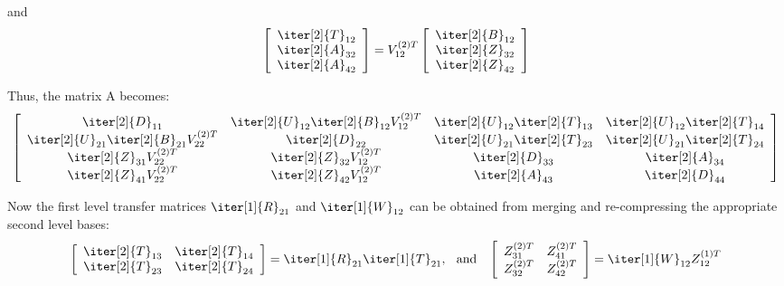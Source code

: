 \noindent and
\begin{equation}
  \left[
    \begin{array}{c}
      \iter[2]{T}_{12} \\
      \iter[2]{A}_{32} \\
      \iter[2]{A}_{42} \\
    \end{array}
  \right]
  = V_{12}^{(2)T}
  \left[
    \begin{array}{ccc}
      \iter[2]{B}_{12} \\
      \iter[2]{Z}_{32} \\
      \iter[2]{Z}_{42} \\
    \end{array}
  \right]
\end{equation}

\noindent Thus, the matrix A becomes:
\begin{equation}
  \left[
    \begin{array}{cccc}
      \iter[2]{D}_{11}& \iter[2]{U}_{12}\iter[2]{B}_{12}V_{12}^{(2)T} & \iter[2]{U}_{12}\iter[2]{T}_{13}& \iter[2]{U}_{12}\iter[2]{T}_{14} \\
      \iter[2]{U}_{21}\iter[2]{B}_{21} V_{22}^{(2)T}& \iter[2]{D}_{22} & \iter[2]{U}_{21}\iter[2]{T}_{23}& \iter[2]{U}_{21}\iter[2]{T}_{24} \\
      \iter[2]{Z}_{31}V_{22}^{(2)T} & \iter[2]{Z}_{32}V_{12}^{(2)T} & \iter[2]{D}_{33}& \iter[2]{A}_{34} \\
      \iter[2]{Z}_{41}V_{22}^{(2)T} & \iter[2]{Z}_{42}V_{12}^{(2)T} & \iter[2]{A}_{43}& \iter[2]{D}_{44} \\
    \end{array}
  \right]
\end{equation}

\noindent Now the first level transfer matrices $\iter[1]{R}_{21}$ and $\iter[1]{W}_{12}$ can be obtained from merging and re-compressing the appropriate second level bases:
\begin{equation}
  \left[
    \begin{array}{cc}
      \iter[2]{T}_{13}& \iter[2]{T}_{14}  \\
      \iter[2]{T}_{23}& \iter[2]{T}_{24}  \\
    \end{array}
  \right]
  =  \iter[1]{R}_{21} \iter[1]{T}_{21}\text{,}\;\; \text{ and }\;\; 
  \left[
    \begin{array}{cc}
      Z_{31}^{(2)T}& Z_{41}^{(2)T}  \\
      Z_{32}^{(2)T}& Z_{42}^{(2)T}  \\
    \end{array}
  \right] = \iter[1]{W}_{12}Z_{12}^{(1)T} 
\end{equation}

